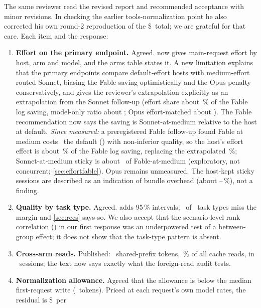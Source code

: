 The same reviewer read the revised report and recommended acceptance with minor revisions. In checking the earlier
tools-normalization point he also corrected his own round-2 reproduction of the \$\ToolsDeltaTotal\ total; we are
grateful for that care. Each item and the response:
\begin{enumerate}[leftmargin=1.6em]
  \item \textbf{Effort on the primary endpoint.} Agreed.  now gives main-request effort by host,
    arm and model, and the arms table states it. A new limitation explains that the primary endpoints compare
    default-effort hosts with medium-effort routed Sonnet, biasing the Fable saving optimistically and the Opus
    penalty conservatively, and gives the reviewer's extrapolation explicitly as an extrapolation from the Sonnet
    follow-up (effort share about \RgEffShareFable\,\% of the Fable log saving, model-only ratio about
    \RgModelOnlyFable; Opus effort-matched about \RgOpusMatched\X). The Fable recommendation now says the saving is
    Sonnet-at-medium relative to the host at default. \emph{Since measured:} a preregistered Fable follow-up found
    Fable at medium costs \EfRatio\X\ the default (\EfCI) with non-inferior quality, so the host's effort effect is
    about \EfShare\,\% of the Fable log saving, replacing the extrapolated \RgEffShareFable\,\%; Sonnet-at-medium sticky
    is about \EfStickyVsMedium\X\ of Fable-at-medium (exploratory, not concurrent; \cref{sec:effortfable}). Opus
    remains unmeasured. The host-kept sticky sessions are
    described as an indication of bundle overhead (about \RgOverheadFable--\RgOverheadOpus\,\%), not a finding.
  \item \textbf{Quality by task type.} Agreed.  adds 95\,\% intervals; \RgNTaskFail\ of \RgNTask\
    task types miss the margin and \cref{sec:recs} says so. We also accept that the scenario-level rank correlation
    (\RvSpearman) in our first response was an underpowered test of a between-group effect; it does not show that
    the task-type pattern is absent.
  \item \textbf{Cross-arm reads.} Published: \RgCrossTokens\ shared-prefix tokens, \RgCrossShare\,\% of all cache
    reads, in \RgCrossSessions\ sessions; the text now says exactly what the foreign-read audit tests.
  \item \textbf{Normalization allowance.} Agreed that the allowance is below the median first-request write
    (\RgStaticMedian\ tokens). Priced at each request's own model rates, the residual is \$\RgResidFableAnchor\ per

\end{enumerate}
